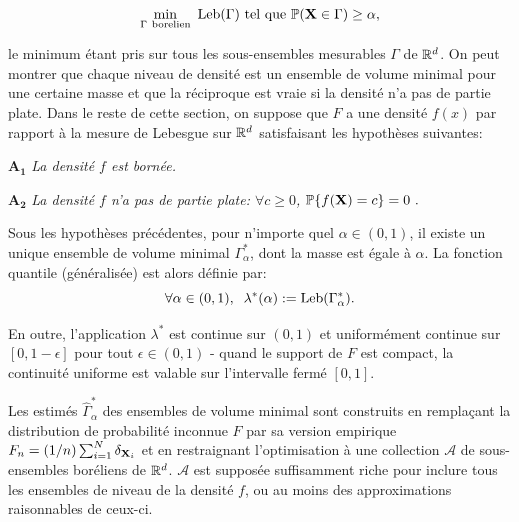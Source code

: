 \begin{equation}\label{resume_fr:eq:MV}\min_{\Gamma~ \text{borelien}} ~\text{Leb}(\Gamma) \mbox{~tel que~} \mathbb{P}(\mathbf X \in \Gamma) \ge \alpha,
\end{equation}

le minimum étant pris sur tous les sous-ensembles mesurables $ \Gamma $ de $ \mathbb{R}^d $.
On peut montrer que chaque niveau de densité est un ensemble de volume minimal pour une certaine masse et que la réciproque est vraie si la densité n'a pas de partie plate.
Dans le reste de cette section, on suppose que $F$ a une densité $ f(x) $ par rapport à la mesure de Lebesgue sur $ \mathbb{R}^d $ satisfaisant les hypothèses suivantes:

\noindent $\mathbf{A_1}$ {\it La densité $f$ est bornée.}%

\noindent $\mathbf{A_2}$ {\it La densité $f$ n'a pas de partie plate: $\forall c\geq 0$, $\mathbb{P}\{f(\mathbf X)=c\}=0~.$}

Sous les hypothèses précédentes, pour n'importe quel $\alpha\in (0,1)$, il existe un unique ensemble de volume minimal $\Gamma_\alpha^*$, dont la masse est égale à $\alpha$.
La fonction quantile (généralisée) est alors définie par:
$$
\forall \alpha\in (0,1),\;\; \lambda^*(\alpha) := \text{Leb}(\Gamma^*_{\alpha}).
$$

En outre, l'application $ \lambda^* $ est continue sur $(0,1)$ et uniformément continue sur $ [0,1- \epsilon] $ pour tout $ \epsilon \in (0,1) $ - quand le support de $ F $ est compact, la continuité uniforme est valable sur l'intervalle fermé $[0,1] $.


Les estimés $ \widehat {\Gamma}^*_{\alpha} $ des ensembles de volume minimal sont construits en remplaçant la distribution de probabilité inconnue $ F $ par sa version empirique $ F_n = (1 / n) \sum_ {i = 1} ^ N \delta _ {\mathbf X_i} $ et en restraignant l'optimisation à une collection $ \mathcal{A} $ de sous-ensembles boréliens de $ \mathbb{R}^d $. $ \mathcal {A} $ est supposée suffisamment riche pour inclure tous les ensembles de niveau de la densité $f$, ou au moins des approximations raisonnables de ceux-ci.

